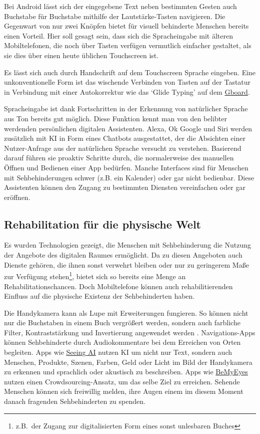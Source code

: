 Bei Android lässt sich der eingegebene Text neben bestimmten Gesten auch Buchstabe für Buchstabe mithilfe der Lautstärke-Tasten navigieren. Die Gegenwart von nur zwei Knöpfen bietet für visuell behinderte Menschen bereits einen Vorteil. Hier soll gesagt sein, dass sich die Spracheingabe mit älteren Mobiltelefonen, die noch über Tasten verfügen vermutlich einfacher gestaltet, als sie dies über einen heute üblichen Touchscreen ist. 

Es lässt sich auch durch Handschrift auf dem Touchscreen Sprache eingeben. Eine unkonventionelle Form ist das wischende Verbinden von Tasten auf der Tastatur in Verbindung mit einer Autokorrektur wie das `Glide Typing' auf dem \href{https://play.google.com/store/apps/details?id=com.google.android.inputmethod.latin&hl=en}{Gboard}.

Spracheingabe ist dank Fortschritten in der Erkennung von natürlicher Sprache aus Ton bereits gut möglich. Diese Funktion kennt man von den belibter werdenden persönlichen digitalen Assistenten. Alexa, Ok Google und Siri werden zusätzlich mit KI in Form eines Chatbots ausgestattet, der die Absichten einer Nutzer-Anfrage aus der natürlichen Sprache versucht zu verstehen. Basierend darauf führen sie proaktiv Schritte durch, die normalerweise des manuellen Öffnen und Bedienen einer App
bedürfen. Manche Interfaces sind für Menschen mit Sehbehinderungen schwer (z.B. ein Kalender) oder gar nicht bedienbar. Diese Assistenten können den Zugang zu bestimmten Diensten vereinfachen oder gar eröffnen.

\subsection{Rehabilitation für die physische Welt}

Es wurden Technologien gezeigt, die Menschen mit Sehbehinderung die Nutzung der Angebote des digitalen Raumes ermöglicht. Da zu diesen Angeboten auch Dienste gehören, die ihnen sonst verwehrt bleiben oder nur zu geringerem Maße zur Verfügung stehen\footnote{z.B.\ der Zugang zur digitalisierten Form eines sonst unlesbaren Buches}, bietet sich so bereits eine Menge an Rehabilitationschancen. Doch Mobiltelefone können auch rehabilitierenden Einfluss auf die physische Existenz der Sehbehinderten haben.

Die Handykamera kann als Lupe mit Erweiterungen fungieren. So können nicht nur die Buchstaben in einem Buch vergrößert werden, sondern auch farbliche Filter, Kontraststärkung und Invertierung angewendet werden \cite{ios-magnifier}. Navigations-Apps können Sehbehinderte durch Audiokommentare bei dem Erreichen von Orten begleiten. Apps wie \href{https://apps.apple.com/us/app/seeing-ai/id999062298}{Seeing AI} nutzen KI um nicht nur Text, sondern auch Menschen, Produkte, Szenen, Farben, Geld oder Licht im Bild der Handykamera zu erkennen und sprachlich oder akustisch zu beschreiben.
Apps wie \href{https://play.google.com/store/apps/details?id=com.bemyeyes.bemyeyes}{BeMyEyes} nutzen einen Crowdsourcing-Ansatz, um das selbe Ziel zu erreichen. Sehende Menschen können sich freiwillig melden, ihre Augen einem im diesem Moment danach fragenden Sehbehinderten zu spenden.

